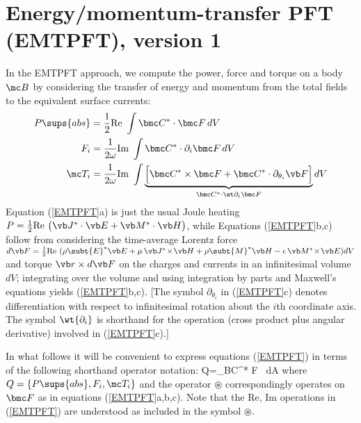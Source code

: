 \newpage
\section{Energy/momentum-transfer PFT (EMTPFT), version 1}

In the EMTPFT approach, we compute the power, force and torque
on a body $\mc B$ by considering the transfer of energy and
momentum from the total fields to the equivalent surface currents:
\begin{subequations}
\begin{align}
 P\sups{abs}&=\frac{1}{2}\text{Re }\int \bmc C^* \cdot \bmc F \, dV 
\\
 F_i&=\frac{1}{2\omega}\text{Im }\int \bmc C^* \cdot \partial_i \bmc F \, dV
\\
 \mc T_i
 &=\frac{1}{2\omega}\text{Im }\int
 \underbrace{
 \Big[   \bmc C^* \times \bmc F 
       + \bmc C^* \cdot \partial_{\theta_i} \vb F\Big]
            }_{\bmc C^* \cdot \wt \partial_i \bmc F}dV
\end{align}
\label{EMTPFT}%
\end{subequations}%
Equation (\ref{EMTPFT}a) is just the usual Joule heating
$P=\frac{1}{2}\text{Re } \big(\vb J^*\cdot \vb E + \vb M^* \cdot \vb H\big)$,
while Equations (\ref{EMTPFT}b,c) follow from considering the time-average
Lorentz force 
$d\vb F=\frac{1}{2}\text{Re }
      (\rho\subt{E}^* \vb E + \mu\, \vb J^* \! \times \! \vb H
      +\rho\subt{M}^* \vb H - \epsilon\, \vb M^* \! \times \! \vb E
      )dV
$
and torque $\vb r\times d\vb F$ on the charges and currents
in an infinitesimal volume $dV$; integrating over the
volume and using integration by parts and Maxwell's equations
yields (\ref{EMTPFT}b,c). [The symbol $\partial_{\theta_i}$
in (\ref{EMTPFT}c) denotes differentiation with 
respect to infinitesimal rotation about the $i$th coordinate 
axis. The symbol $\wt{\partial_i}$ is shorthand for the 
operation (cross product plus angular derivative)
involved in (\ref{EMTPFT}c).]

In what follows it will be convenient to express equations
(\ref{EMTPFT}) in terms of the following shorthand operator notation:
{
 Q=\int_{\partial \mc B}\bmc C^* \circledast \bmc F \, dA
}
where $Q=\{P\sups{abs}, F_i, \mc T_i\}$ and
the operator $\circledast$ correspondingly operates on $\bmc F$ as
in equations (\ref{EMTPFT}a,b,c). Note that the $\text{Re, Im}$
operations in (\ref{EMTPFT}) are understood as included in 
the symbol $\circledast$.

